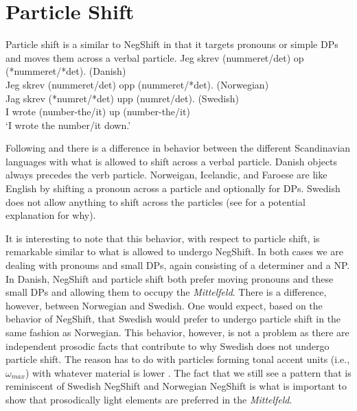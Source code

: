 \documentclass[12pt, letterpaper]{article}
\begin{document}
\section{Particle Shift} \label{sec:ParticleShift}

Particle shift is a similar to NegShift in that it targets pronouns or simple DPs and moves them across a verbal particle. 
\ea \gllll Jeg skrev (nummeret/det) op (*nummeret/*det). \hfill (Danish)\\
		Jeg skrev (nummeret/det) opp (nummeret/*det). \hfill (Norwegian)\\
		Jag skrev (*numret/*det) upp (numret/det). \hfill (Swedish)\\
		I wrote (number-the/it) up (number-the/it)\\
\glt `I wrote the number/it down.'
\z 

Following \citet[2]{holmbergRemarksHolmbergGeneralization1999} and \citet{faarlundSyntaxMainlandScandinavian2019} there is a difference in behavior between the different Scandinavian languages with what is allowed to shift across a verbal particle. Danish objects always precedes the verb particle. Norweigan, Icelandic, and Faroese are like English by shifting a pronoun across a particle and optionally for DPs. Swedish does not allow anything to shift across the particles (see \cite{erteschik-shirVariationMainlandScandinavian2020} for a potential explanation for why).

It is interesting to note that this behavior, with respect to particle shift, is remarkable similar to what is allowed to undergo NegShift. In both cases we are dealing with pronouns and small DPs, again consisting of a determiner and a NP. In Danish, NegShift and particle shift both prefer moving pronouns and these small DPs and allowing them to occupy the \emph{Mittelfeld}. There is a difference, however, between Norwegian and Swedish. One would expect, based on the behavior of NegShift, that Swedish would prefer to undergo particle shift in the same fashion as Norwegian. This behavior, however, is not a problem as there are independent prosodic facts that contribute to why Swedish does not undergo particle shift. The reason has to do with particles forming tonal accent units (i.e., $\omega_{max}$) with whatever material is lower \citep[see][]{erteschik-shirVariationMainlandScandinavian2020}. The fact that we still see a pattern that is reminiscent of Swedish NegShift and Norwegian NegShift is what is important to show that prosodically light elements are preferred in the \emph{Mittelfeld}. 
\end{document}
